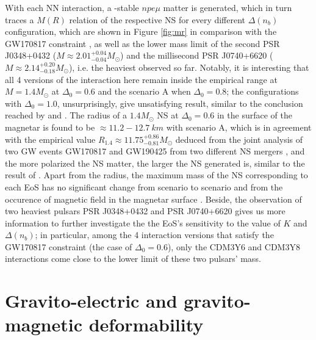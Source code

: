 With each \gls{NN} interaction, a \textbeta-stable $npe\mu$ matter is generated, which in turn traces a $M(R)$ relation of the respective \gls{NS} for every different $\Delta(n_b)$ configuration, which are shown in Figure \ref{fig:mr} in comparison with the GW170817 constraint \citep{abbott2018gw170817}, as well as the lower mass limit of the second \gls{PSR} J0348+0432 ($M\approx 2.01^{+0.04}_{-0.04}M_\odot$) and the millisecond \gls{PSR} J0740+6620 ($M\approx 2.14^{+0.20}_{-0.18}M_\odot$), i.e. the heaviest  observed so far. Notably, it is interesting that all 4 versions of the interaction here remain inside the empirical range at $M=1.4M_\odot$ at $\Delta_0 = 0.6$ and the scenario A when $\Delta_0 = 0.8$; the configurations with $\Delta_0 = 1.0$, unsurprisingly, give unsatisfying result, similar to the conclusion reached by \cite{tan2020spin} and \cite{tews2020spin}. The radius of a $1.4M_\odot$ \gls{NS} at $\Delta_0 = 0.6$ in the surface of the magnetar is found to be $\approx 11.2 - 12.7\:km$ with scenario A, which is in agreement with the empirical value $R_{1.4} \approx 11.75^{+0.86}_{-0.81}M_\odot$ deduced from the joint analysis of two \gls{GW} events GW170817 and GW190425 from two different \gls{NS} mergers \citep{dietrich2020multimessenger}, and the more polarized the \gls{NS} matter, the larger the \gls{NS} generated is, similar to the result of \cite{tan2020spin}. Apart from the radius, the maximum mass of the \gls{NS} corresponding to each \gls{EoS} has no significant change from scenario to scenario and from the occurence of magnetic field in the magnetar surface \citep{tan2021equation}. Beside, the observation of two heaviest pulsars \gls{PSR} J0348+0432 and \gls{PSR} J0740+6620 gives us more information to further investigate the the \gls{EoS}'s sensitivity to the value of $K$ and $\Delta(n_b)$; in particular, among the 4 interaction versions that satisfy the GW170817 constraint (the case of $\Delta_0 = 0.6$), only the CDM3Y6 and CDM3Y8 interactions come close to the lower limit of these two pulsars' mass.

\section{Gravito-electric and gravito-magnetic deformability}%
\label{sec:gravito_electric_and_gravito_magnetic_deformability}

